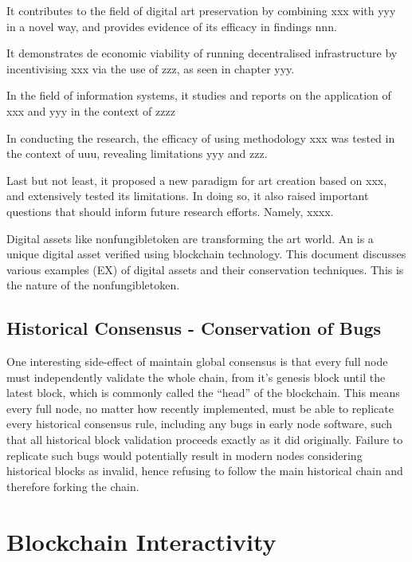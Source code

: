 It contributes to the field of digital art preservation by combining xxx with yyy in a novel way, and provides evidence of its efficacy in findings nnn.

It demonstrates de economic viability of running decentralised infrastructure by incentivising xxx via the use of zzz, as seen in chapter yyy.

In the field of information systems, it studies and reports on the application of xxx and yyy in the context of zzzz

In conducting the research, the efficacy of using methodology xxx was tested in the context of uuu, revealing limitations yyy and zzz.

Last but not least, it proposed a new paradigm for art creation based on xxx, and extensively tested its limitations. In doing so, it also raised important questions that should inform future research efforts. Namely, xxxx.

Digital assets like \gls{nonfungibletoken} are transforming the art world. An  is a unique digital asset verified using blockchain technology.
This document discusses various examples (EX) of digital assets and their conservation techniques. This is the nature of the \gls{nonfungibletoken}.



\subsection{Historical Consensus - Conservation of Bugs}

One interesting side-effect of maintain global consensus is that every full node must independently validate the whole chain, from it's genesis block until the latest block, which is commonly called the ``head'' of the blockchain. This means every full node, no matter how recently implemented, must be able to replicate every historical consensus rule, including any bugs in early node software, such that all historical block validation proceeds exactly as it did originally. Failure to replicate such bugs would potentially result in modern nodes considering historical blocks as invalid, hence refusing to follow the main historical chain and therefore forking the chain.


\section{Blockchain Interactivity}



